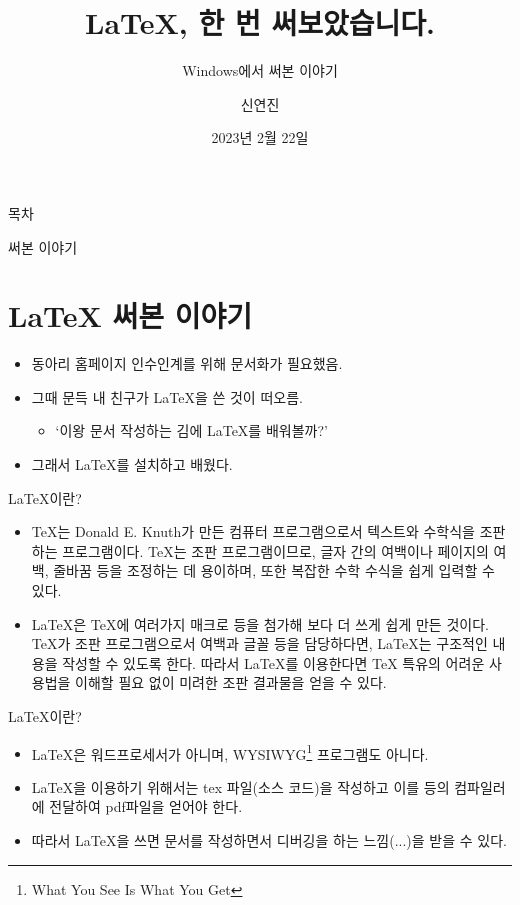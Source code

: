 \documentclass{beamer}
\title{\LaTeX{}, 한 번 써보았습니다.}
\subtitle{Windows에서 \LaTeXe{} 써본 이야기}
\author{신연진}
\date{2023년 2월 22일}
\begin{document}
\frame{\titlepage}

\begin{frame}{목차}
    \tableofcontents[hideallsubsections]
\end{frame}

\begin{frame}{써본 이야기}
    \section{\LaTeX{} 써본 이야기}
    \begin{itemize}
        \item 동아리 홈페이지 인수인계를 위해 문서화가 필요했음.
        \item 그때 문득 내 친구가 \LaTeX{}을 쓴 것이 떠오름.
        \begin{itemize}
            \item `이왕 문서 작성하는 김에 \LaTeX{}를 배워볼까?'
        \end{itemize}
        \item 그래서 \LaTeX{}를 설치하고 배웠다.
    \end{itemize}
\end{frame}

\begin{frame}{\LaTeX{}이란?}
    \begin{itemize}
        \section{\LaTeX{}이란?}
        \item \TeX{}는 Donald E. Knuth가 만든 컴퓨터 프로그램으로서 텍스트와 수학식을 조판하는 프로그램이다. \TeX{}는 조판 프로그램이므로, 글자 간의 여백이나 페이지의 여백, 줄바꿈 등을 조정하는 데 용이하며, 또한 복잡한 수학 수식을 쉽게 입력할 수 있다.

        \item \LaTeX{}은 \TeX{}에 여러가지 매크로 등을 첨가해 보다 더 쓰게 쉽게 만든 것이다. \TeX{}가 조판 프로그램으로서 여백과 글꼴 등을 담당하다면, \LaTeX{}는 구조적인 내용을 작성할 수 있도록 한다. 따라서 \LaTeX{}를 이용한다면 \TeX{} 특유의 어려운 사용법을 이해할 필요 없이 미려한 조판 결과물을 얻을 수 있다.
    \end{itemize}
\end{frame}

\begin{frame}{\LaTeX{}이란?}
    \begin{itemize}
        \item \LaTeX{}은 워드프로세서가 아니며, WYSIWYG\footnote{What You See Is What You Get} 프로그램도 아니다.
        \item \LaTeX{}을 이용하기 위해서는 tex 파일(소스 코드)을 작성하고 이를 \XeLaTeX{} 등의 컴파일러에 전달하여 pdf파일을 얻어야 한다.
        \item 따라서 \LaTeX{}을 쓰면 문서를 작성하면서 디버깅을 하는 느낌(...)을 받을 수 있다.
    \end{itemize}
\end{frame}
\end{document}

